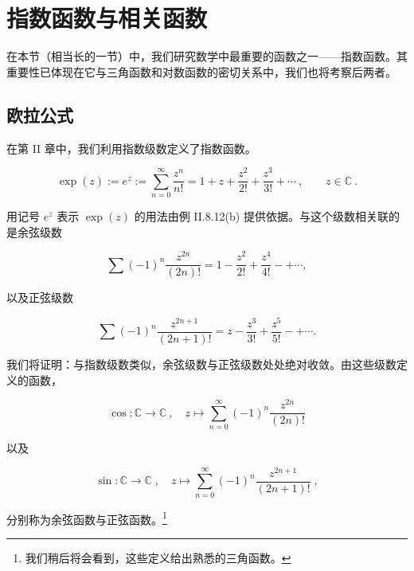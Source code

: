 \section{指数函数与相关函数}

在本节（相当长的一节）中，我们研究数学中最重要的函数之一——指数函数。其重要性已体现在它与三角函数和对数函数的密切关系中，我们也将考察后两者。

\subsection*{欧拉公式}

在第 II 章中，我们利用指数级数定义了指数函数。

\[
\exp(z):=e^{z}:=\sum_{n=0}^{\infty}\frac{z^{n}}{n!}=1+z+\frac{z^{2}}{2!}+\frac{z^{3}}{3!}+\cdots~,\qquad z\in\mathbb{C}~.
\]

用记号 $ e^{z} $ 表示 $ \exp(z) $ 的用法由例 II.8.12(b) 提供依据。与这个级数相关联的是余弦级数

\[
\sum(-1)^{n}\frac{z^{2n}}{(2n)!}=1-\frac{z^{2}}{2!}+\frac{z^{4}}{4!}-+\cdots,
\]

以及正弦级数

\[
\sum(-1)^{n}\frac{z^{2n+1}}{(2n+1)!}=z-\frac{z^{3}}{3!}+\frac{z^{5}}{5!}-+\cdots.
\]

我们将证明：与指数级数类似，余弦级数与正弦级数处处绝对收敛。由这些级数定义的函数，

\[
\cos:\mathbb{C}\to\mathbb{C}~,\quad z\mapsto\sum_{n=0}^{\infty}(-1)^{n}\frac{z^{2n}}{(2n)!}
\]

以及

\[
\sin:\mathbb{C}\to\mathbb{C}\;,\quad z\mapsto\sum_{n=0}^{\infty}(-1)^{n}\frac{z^{2n+1}}{(2n+1)!}\;,
\]

分别称为余弦函数与正弦函数。\footnote{我们稍后将会看到，这些定义给出熟悉的三角函数。}

